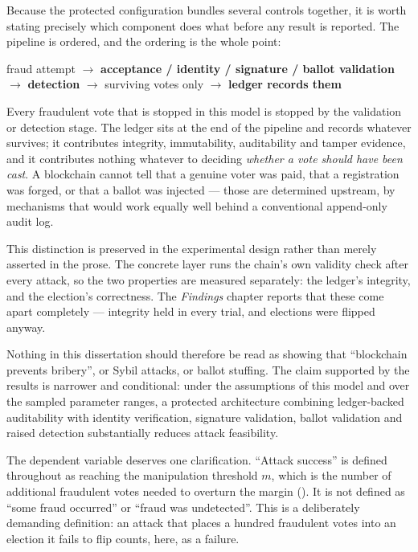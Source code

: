 Because the protected configuration bundles several controls together,
it is worth stating precisely which component does what before any
result is reported. The pipeline is ordered, and the ordering is the
whole point:

\begin{center}
\small
fraud attempt $\rightarrow$ \textbf{acceptance / identity / signature /
ballot validation} $\rightarrow$ \textbf{detection} $\rightarrow$
surviving votes only $\rightarrow$ \textbf{ledger records them}
\end{center}

Every fraudulent vote that is stopped in this model is stopped by the
validation or detection stage. The ledger sits at the end of the
pipeline and records whatever survives; it contributes integrity,
immutability, auditability and tamper evidence, and it contributes
nothing whatever to deciding \emph{whether a vote should have been
cast}. A blockchain cannot tell that a genuine voter was paid, that a
registration was forged, or that a ballot was injected --- those are
determined upstream, by mechanisms that would work equally well behind
a conventional append-only audit log.

This distinction is preserved in the experimental design rather than
merely asserted in the prose. The concrete layer runs the chain's own
validity check after every attack, so the two properties are measured
separately: the ledger's integrity, and the election's correctness. The
\emph{Findings} chapter reports that these come apart completely ---
integrity held in every trial, and elections were flipped anyway.

Nothing in this dissertation should therefore be read as showing that
``blockchain prevents bribery'', or Sybil attacks, or ballot stuffing.
The claim supported by the results is narrower and conditional: under
the assumptions of this model and over the sampled parameter ranges, a
protected architecture combining ledger-backed auditability with
identity verification, signature validation, ballot validation and
raised detection substantially reduces attack feasibility.

The dependent variable deserves one clarification. ``Attack success''
is defined throughout as reaching the manipulation threshold $m$, which
is the number of additional fraudulent votes needed to overturn the
margin (). It is not defined as ``some fraud
occurred'' or ``fraud was undetected''. This is a deliberately
demanding definition: an attack that places a hundred fraudulent votes
into an election it fails to flip counts, here, as a failure.

